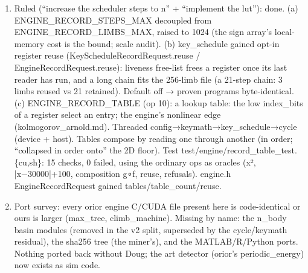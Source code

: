 \begin{enumerate}
\item Ruled (“increase the scheduler steps to n” + “implement the lut”): done. (a) ENGINE\_\allowbreak{}RECORD\_\allowbreak{}STEPS\_\allowbreak{}MAX decoupled from ENGINE\_\allowbreak{}RECORD\_\allowbreak{}LIMBS\_\allowbreak{}MAX, raised to 1024 (the sign array's local-memory cost is the bound; scale audit). (b) key\_\allowbreak{}schedule gained opt-in register reuse (KeyScheduleRecordRequest.reuse / EngineRecordRequest.reuse): liveness free-list frees a register once its last reader has run, and a long chain fits the 256-limb file (a 21-step chain: 3 limbs reused vs 21 retained). Default off → proven programs byte-identical. (c) ENGINE\_\allowbreak{}RECORD\_\allowbreak{}TABLE (op 10): a lookup table: the low index\_\allowbreak{}bits of a register select an entry; the engine's nonlinear edge (kolmogorov\_\allowbreak{}arnold.md). Threaded config→keymath→key\_\allowbreak{}schedule→cycle (device + host). Tables compose by reading one through another (in order; “collapsed in order onto” the 2D floor). Test test/engine/record\_\allowbreak{}table\_\allowbreak{}test.\{cu,sh\}: 15 checks, 0 failed, using the ordinary ops as oracles (x², |x−30000|+100, composition g∘f, reuse, refusals). engine.h EngineRecordRequest gained tables/table\_\allowbreak{}count/reuse.
\item Port survey: every orior engine C/CUDA file present here is code-identical or ours is larger (max\_\allowbreak{}tree, climb\_\allowbreak{}machine). Missing by name: the n\_\allowbreak{}body basin modules (removed in the v2 split, superseded by the cycle/keymath residual), the sha256 tree (the miner's), and the MATLAB/R/Python ports. Nothing ported back without Doug; the art detector (orior's periodic\_\allowbreak{}energy) now exists as sim code.

\end{enumerate}
